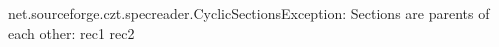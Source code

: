 net.sourceforge.czt.specreader.CyclicSectionsException: Sections are parents of each other: rec1 rec2